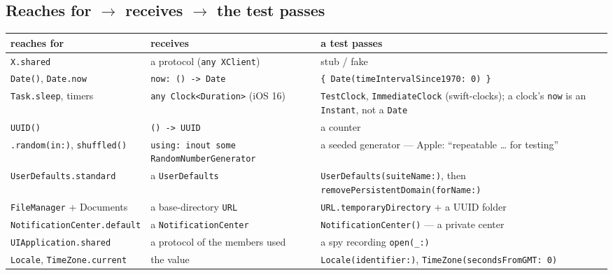\documentclass[8pt]{extarticle}
\newcommand\ct[1]{\texttt{#1}}
\begin{document}
\begin{multicols}{2}
\section{Reaches for $\rightarrow$ receives $\rightarrow$ the test passes}
{\scriptsize\setlength{\tabcolsep}{2pt}
\begin{tabular}{@{}L{20mm}L{22mm}L{35mm}@{}}
\toprule
\textbf{reaches for} & \textbf{receives} & \textbf{a test passes}\\
\midrule
\ct{X.shared} & a protocol (\ct{any XClient}) & stub / fake\\
\ct{Date()}, \ct{Date.now} & \ct{now: () -> Date} & \ct{\{ Date(timeIntervalSince1970: 0) \}}\\
\ct{Task.sleep}, timers & \ct{any Clock<Duration>} (iOS 16) & \ct{TestClock}, \ct{ImmediateClock} (swift-clocks); a clock's \ct{now} is an \ct{Instant}, not a \ct{Date}\\
\ct{UUID()} & \ct{() -> UUID} & a counter\\
\ct{.random(in:)}, \ct{shuffled()} & \ct{using: inout some} \ct{RandomNumberGenerator} & a seeded generator — Apple: ``repeatable \ldots{} for testing''\\
\ct{UserDefaults}\allowbreak\ct{.standard} & a \ct{UserDefaults} & \ct{UserDefaults(suiteName:)}, then \ct{removePersistentDomain(forName:)}\\
\ct{FileManager} + Documents & a base-directory \ct{URL} & \ct{URL.temporaryDirectory} + a UUID folder\\
\ct{NotificationCenter}\allowbreak\ct{.default} & a \ct{NotificationCenter} & \ct{NotificationCenter()} — a private center\\
\ct{UIApplication}\allowbreak\ct{.shared} & a protocol of the members used & a spy recording \ct{open(\_:)}\\
\ct{Locale}, \ct{TimeZone}\allowbreak\ct{.current} & the value & \ct{Locale(identifier:)}, \ct{TimeZone(secondsFromGMT: 0)}\\
\bottomrule
\end{tabular}}


\end{multicols}
\end{document}
